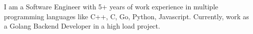 \documentclass[letter,10pt]{article}
\begin{document}


I am a Software Engineer with 5+ years of work experience in multiple programming languages like C++, C, Go, Python, Javascript. Currently, work as a Golang Backend Developer in a high load project.
\end{document}
